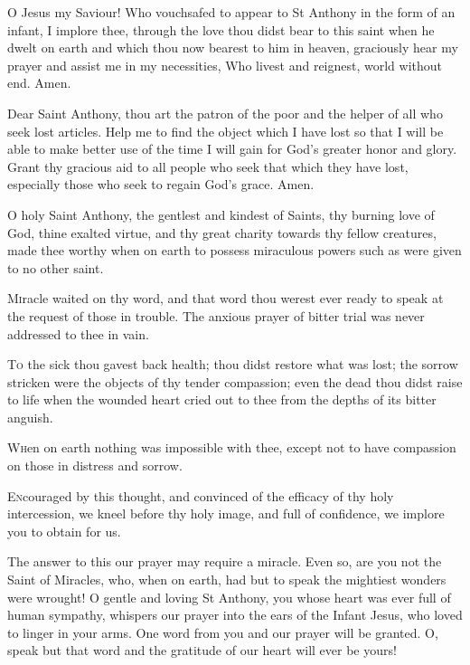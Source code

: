 {\centering\Large{\MakeUppercase{}}\par}


O Jesus my Saviour! Who vouchsafed to appear to St Anthony in the form of an infant, I implore thee, through the love thou didst bear to this saint when he dwelt on earth and which thou now bearest to him in heaven, graciously hear my prayer and assist me in my necessities, Who livest and reignest, world without end. Amen.


Dear Saint Anthony, thou art the patron of the poor and the helper of all who seek lost articles. Help me to find the object which I have lost so that I will be able to make better use of the time I will gain for God’s greater honor and glory. Grant thy gracious aid to all people who seek that which they have lost, especially those who seek to regain God’s grace. Amen.


\lettrine{O}{} holy Saint Anthony, the gentlest and
kindest of Saints, thy burning love of
God, thine exalted virtue, and thy great
charity towards thy fellow creatures,
made thee worthy when on earth to
possess miraculous powers such as were
given to no other saint.

\lettrine{M}{i}racle waited on thy word, and that
word thou werest ever ready to speak at the
request of those in trouble.
The anxious prayer of bitter trial was
never addressed to thee in vain.

\lettrine{T}{o} the sick thou gavest back health; thou didst
restore what was lost; the sorrow
stricken were the objects of thy tender
compassion; even the dead thou didst raise to
life when the wounded heart cried out to
thee from the depths of its bitter anguish.

\lettrine{W}{h}en on earth nothing was impossible with thee, except not to have
compassion on those in distress and sorrow.

\lettrine{E}{n}couraged by this thought, and convinced of the efficacy of thy holy
intercession, we kneel before thy holy image, and full of confidence, we
implore you to obtain for us.


The answer to this our prayer may require a miracle. Even so, are you not
the Saint of Miracles, who, when on earth, had but to speak the mightiest
wonders were wrought!
O gentle and loving St Anthony, you whose heart was ever full of human
sympathy, whispers our prayer into the ears of the Infant Jesus, who loved
to linger in your arms.
One word from you and our prayer will be granted. O, speak but that word
and the gratitude of our heart will ever be yours!

